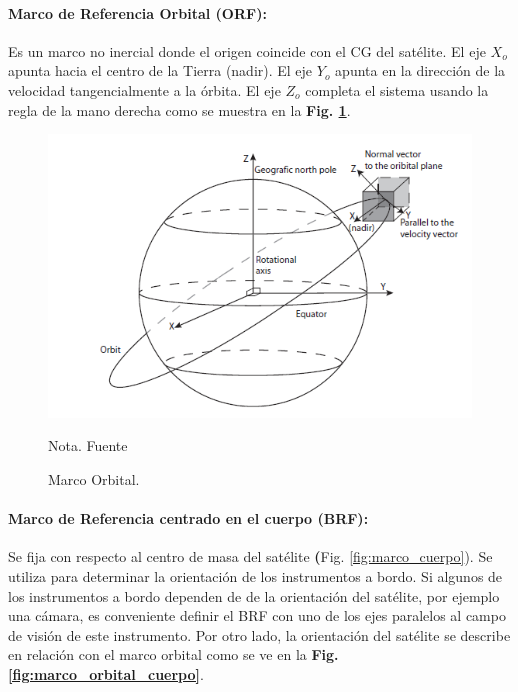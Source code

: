 \paragraph{Marco de Referencia Orbital (ORF):} Es un marco no inercial donde el origen coincide con el CG del satélite. El eje $X_o$ apunta hacia el centro de la Tierra (nadir). El eje $Y_o$ apunta en la dirección de la velocidad tangencialmente a la órbita. El eje $Z_o$ completa el sistema usando la regla de la mano derecha como se muestra en la \textbf{Fig. \ref{fig:marco_orbital}}.

\begin{figure}[!ht]
	\begin{center}
		\includegraphics[scale=0.7]{imagenes/marco_teorico/marco_orbital.PNG}\\
	\end{center}
	\caption{ Marco Orbital.}
	\label{fig:marco_orbital}
	\footnotesize{Nota. Fuente \cite{Andresen2005}}
\end{figure}



\paragraph{Marco de Referencia centrado en el cuerpo (BRF):}Se fija con respecto al centro de masa del satélite \textbf({Fig. \ref{fig:marco_cuerpo}}). Se utiliza para determinar la orientación de los instrumentos a bordo. Si algunos de los instrumentos a bordo dependen de de la orientación del satélite, por ejemplo una cámara, es conveniente definir el BRF con uno de los ejes paralelos al campo de visión de este instrumento. Por otro lado, la orientación del satélite se describe en relación con el marco orbital como se ve en la \textbf{Fig. \ref{fig:marco_orbital_cuerpo}}.


